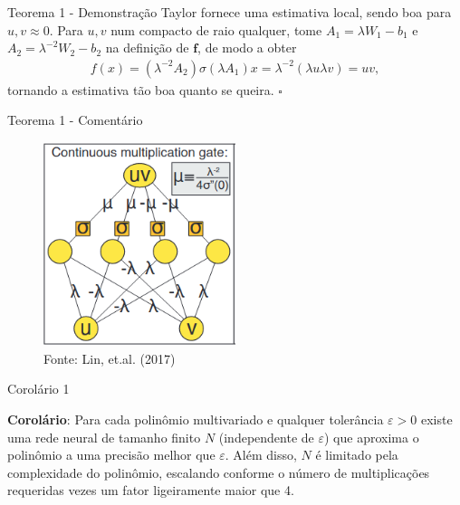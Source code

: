 \documentclass{beamer}
\begin{document}
\begin{frame}{Teorema 1 - Demonstração}
    Taylor fornece uma estimativa local, sendo boa para $u,v \approx 0$. Para $u,v$ num compacto de raio qualquer, tome $ A_1 = \lambda W_1 - b_1$ e $A_2 = \lambda^{-2}W_2 - b_2$ na definição de $\mathbf f$, de modo a obter
    \begin{align*}
        f(x) = (\lambda^{-2}A_2)\sigma(\lambda A_1)x = \lambda^{-2} ( \lambda u \lambda v) = uv,
    \end{align*}
    tornando a estimativa tão boa quanto se queira. $\square$
\end{frame}

\begin{frame}{Teorema 1 - Comentário}
    \begin{figure}
        \caption{Ilustração da arquitetura da rede no teorema anterior}
        \includegraphics[width=0.5\textwidth]{fig/productgate.png}
        \caption*{Fonte: Lin, et.al. (2017)}
    \end{figure}
\end{frame}

\begin{frame}{Corolário 1}
    
    \textbf{Corolário}: Para cada polinômio multivariado e qualquer tolerância $\varepsilon>0$ existe uma rede neural de tamanho finito $N$ (independente de $\varepsilon$) que aproxima o polinômio a uma precisão melhor que $\varepsilon$. Além disso, $N$ é limitado pela complexidade do polinômio, escalando conforme o número de multiplicações requeridas vezes um fator ligeiramente maior que 4.
    
\end{frame}
\end{document}
